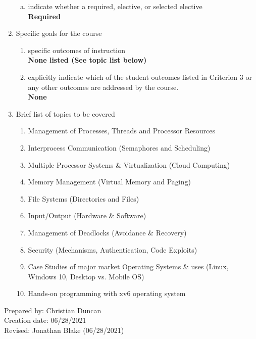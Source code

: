 \begin{enumerate}[1.]
\begin{enumerate}[a.]
\item indicate whether a required, elective, or selected elective\\ %
  {\bfseries
    Required
  }

\end{enumerate}

\item Specific goals for the course
\begin{enumerate}
\item specific outcomes of instruction\\ %
  {\bfseries
    None listed (See topic list below)
  }

\item explicitly indicate which of the student outcomes listed in Criterion 3 or any other outcomes are addressed by the course.\\
  {\bfseries
    None
  }
\end{enumerate}

\item Brief list of topics to be covered\\
  {\bfseries
  \begin{enumerate}
    \item Management of Processes, Threads and Processor Resources
    \item Interprocess Communication (Semaphores and Scheduling)
    \item Multiple Processor Systems \& Virtualization (Cloud Computing)
    \item Memory Management (Virtual Memory and Paging)
    \item File Systems (Directories and Files)
    \item Input/Output (Hardware \& Software)
    \item Management of Deadlocks (Avoidance \& Recovery)
    \item Security (Mechanisms, Authentication, Code Exploits)
    \item Case Studies of major market Operating Systems \& uses (Linux, Windows 10, Desktop vs. Mobile OS)
    \item Hands-on programming with xv6 operating system
  \end{enumerate}
  }

\end{enumerate}

\noindent Prepared by: Christian Duncan\\
\noindent Creation date: 06/28/2021\\
\noindent Revised: Jonathan Blake (06/28/2021)\\
